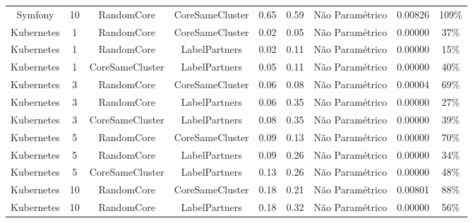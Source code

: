\documentclass[12pt,openany,oneside,a4paper,english,brazil]{abntbibufjf}
\begin{document}
\begin{table}[htbp]
\begin{center}
{\begin{tabular}{|c|c|c|c|c|c|c|c|c|}
   Symfony          & 10         & RandomCore        & CoreSameCluster   & 0.65             & 0.59             & Não Paramétrico        & 0.00826          & 109\%              \\
   Kubernetes       & 1          & RandomCore        & CoreSameCluster   & 0.02             & 0.05             & Não Paramétrico        & 0.00000          & 37\%               \\
   Kubernetes       & 1          & RandomCore        & LabelPartners     & 0.02             & 0.11             & Não Paramétrico        & 0.00000          & 15\%               \\
   Kubernetes       & 1          & CoreSameCluster   & LabelPartners     & 0.05             & 0.11             & Não Paramétrico        & 0.00000          & 40\%               \\
   Kubernetes       & 3          & RandomCore        & CoreSameCluster   & 0.06             & 0.08             & Não Paramétrico        & 0.00004          & 69\%               \\
   Kubernetes       & 3          & RandomCore        & LabelPartners     & 0.06             & 0.35             & Não Paramétrico        & 0.00000          & 27\%               \\
   Kubernetes       & 3          & CoreSameCluster   & LabelPartners     & 0.08             & 0.35             & Não Paramétrico        & 0.00000          & 39\%               \\
   Kubernetes       & 5          & RandomCore        & CoreSameCluster   & 0.09             & 0.13             & Não Paramétrico        & 0.00000          & 70\%               \\
   Kubernetes       & 5          & RandomCore        & LabelPartners     & 0.09             & 0.26             & Não Paramétrico        & 0.00000          & 34\%               \\
   Kubernetes       & 5          & CoreSameCluster   & LabelPartners     & 0.13             & 0.26             & Não Paramétrico        & 0.00000          & 48\%               \\
   Kubernetes       & 10         & RandomCore        & CoreSameCluster   & 0.18             & 0.21             & Não Paramétrico        & 0.00801          & 88\%               \\
   Kubernetes       & 10         & RandomCore        & LabelPartners     & 0.18             & 0.32             & Não Paramétrico        & 0.00000          & 56\%               \\

\end{tabular}}
\end{center}
\end{table}
\end{document}

